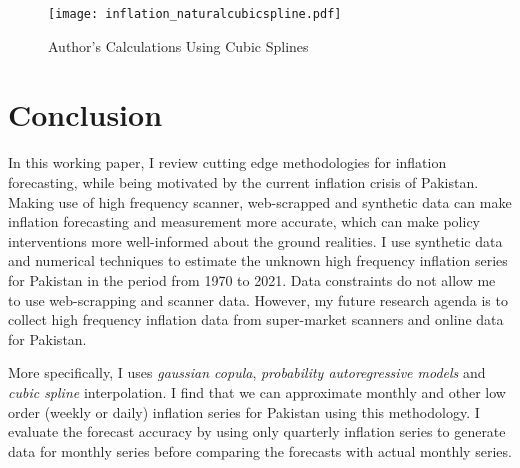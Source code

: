 \documentclass[12pt]{article}
\newcommand{\1}{\mathbbm 1}
\begin{document}
		
		
		
		
		\begin{figure}[H]
			\begin{Center}
				\texttt{[image: inflation\_naturalcubicspline.pdf]}
				\caption{Author's Calculations Using Cubic Splines}
			\end{Center}
		\end{figure}
		
		
		
		
		
		
		
		
		
		
		
		
		
		
		
		
		
		
		\section{Conclusion}
		
		In this working paper, I review cutting edge methodologies for inflation forecasting, while being motivated by the current inflation crisis of Pakistan. Making use of high frequency scanner, web-scrapped and synthetic data can make inflation forecasting and measurement more accurate, which can make policy interventions more well-informed about the ground realities. I use synthetic data and numerical techniques to estimate the unknown high frequency inflation series for Pakistan in the period from 1970 to 2021. Data constraints do not allow me to use web-scrapping and scanner data. However, my future research agenda is to collect high frequency inflation data from super-market scanners and online data for Pakistan. 
		
		More specifically, I uses \textit{gaussian copula}, \textit{probability autoregressive models} and \textit{cubic spline} interpolation. I find that we can approximate monthly and other low order (weekly or daily) inflation series for Pakistan using this methodology. I evaluate the forecast accuracy by using only quarterly inflation series to generate data for monthly series before comparing the forecasts with actual monthly series.
		
		
		
		
		
		
		
		
		
		
		
		
		
\end{document}
